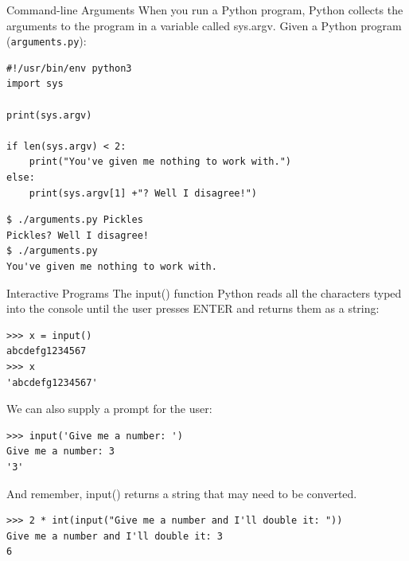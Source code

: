 \documentclass[smaller, aspectratio=1610]{beamer}
\begin{document}
\begin{frame}[label={sec:orgf8c1714},fragile]{Command-line Arguments}
 When you run a Python program, Python collects the arguments to the program in a variable called sys.argv. Given a Python program (\texttt{arguments.py}):

\lstset{language=Python,label= ,caption= ,captionpos=b,numbers=none}
\begin{lstlisting}
#!/usr/bin/env python3
import sys

print(sys.argv)

if len(sys.argv) < 2:
    print("You've given me nothing to work with.")
else:
    print(sys.argv[1] +"? Well I disagree!")
\end{lstlisting}

\lstset{language=Python,label= ,caption= ,captionpos=b,numbers=none}
\begin{lstlisting}
$ ./arguments.py Pickles
Pickles? Well I disagree!
$ ./arguments.py
You've given me nothing to work with.
\end{lstlisting}
\end{frame}

\begin{frame}[label={sec:orge1cfe03},fragile]{Interactive Programs}
 The input() function Python reads all the characters typed into the console until the user presses ENTER and returns them as a string:

\lstset{language=Python,label= ,caption= ,captionpos=b,numbers=none}
\begin{lstlisting}
>>> x = input()
abcdefg1234567
>>> x
'abcdefg1234567'
\end{lstlisting}

We can also supply a prompt for the user:

\lstset{language=Python,label= ,caption= ,captionpos=b,numbers=none}
\begin{lstlisting}
>>> input('Give me a number: ')
Give me a number: 3
'3'
\end{lstlisting}

And remember, input() returns a string that may need to be converted.

\lstset{language=Python,label= ,caption= ,captionpos=b,numbers=none}
\begin{lstlisting}
>>> 2 * int(input("Give me a number and I'll double it: "))
Give me a number and I'll double it: 3
6
\end{lstlisting}
\end{frame}
\end{document}
